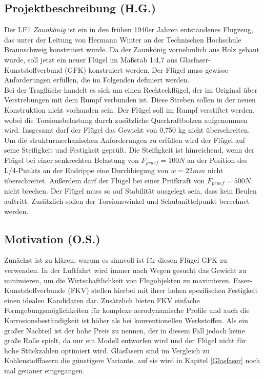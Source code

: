 
\subsection{Projektbeschreibung (H.G.)}
Der LF1 \textit{Zaunkönig} ist ein in den frühen 1940er Jahren entstandenes Flugzeug, das unter der Leitung von Hermann Winter an der Technischen Hochschule Braunschweig konstruiert wurde. Da der Zaunkönig vornehmlich aus Holz gebaut wurde, soll jetzt ein neuer Flügel im Maßstab 1:4,7 aus Glasfaser-Kunststoffverbund (GFK) konstruiert werden. Der Flügel muss gewisse Anforderungen erfüllen, die im Folgenden definiert werden.\\
Bei der Tragfläche handelt es sich um einen Rechteckflügel, der im Original über Verstrebungen mit dem Rumpf verbunden ist. Diese Streben sollen in der neuen Konstruktion nicht vorhanden sein. Der Flügel soll im Rumpf verstiftet werden, wobei die Torsionsbelastung durch zusätzliche Querkraftbolzen aufgenommen wird. Insgesamt darf der Flügel das Gewicht von 0,750 kg nicht überschreiten.\\
Um die strukturmechanischen Anforderungen zu erfüllen wird der Flügel auf seine Steifigkeit und Festigkeit geprüft. Die Steifigkeit ist hinreichend, wenn der Flügel bei einer senkrechten Belastung von $ F_{pruef}=100N $ an der Position des L/4-Punkts an der Endrippe eine Durchbiegung von $ w=22mm $ nicht überschreitet. Außerdem darf der Flügel bei einer Prüfkraft von $ F_{pruef}=500N $ nicht brechen. Der Flügel muss so auf Stabilität ausgelegt sein, dass kein Beulen auftritt. Zusätzlich sollen der Torsionswinkel und Schubmittelpunkt berechnet werden.
\subsection{Motivation (O.S.)}
Zunächst ist zu klären, warum es sinnvoll ist für diesen Flügel GFK zu verwenden. In der Luftfahrt wird immer nach Wegen gesucht das Gewicht zu minimieren, um die Wirtschaftlichkeit von Flugobjekten zu maximieren. Faser-Kunststoffverbunde (FKV) stellen hierbei mit ihrer hohen spezifischen Festigkeit einen idealen Kandidaten dar. Zusätzlich bieten FKV einfache Formgebungsmöglichkeiten für komplexe aerodynamische Profile und auch die Korrosionsbeständigkeit ist höher als bei konventionellen Werkstoffen. Als ein großer Nachteil ist der hohe Preis zu nennen, der in diesem Fall jedoch keine große Rolle spielt, da nur ein Modell entworfen wird und der Flügel nicht für hohe Stückzahlen optimiert wird. Glasfasern sind im Vergleich zu Kohlenstofffasern die günstigere Variante, auf sie wird in Kapitel \ref{Glasfaser} noch mal genauer eingegangen.

